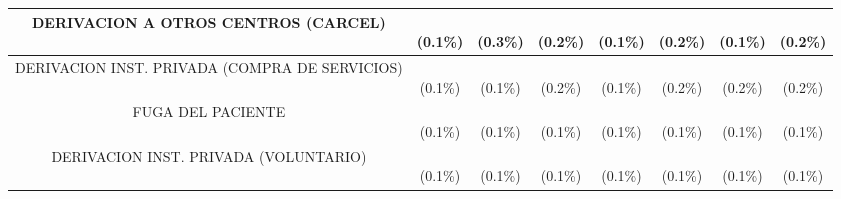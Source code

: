 \begin{table}[htbp]
\begin{tabular}{|c|c|c|c|c|c|c|c|}
\parbox[t]{4.0cm}{\raggedright DERIVACION A OTROS CENTROS (CARCEL)} & \parbox[t]{1.2cm}{\\(0.1\%)} & \parbox[t]{1.2cm}{\\(0.3\%)} & \parbox[t]{1.2cm}{\\(0.2\%)} & \parbox[t]{1.2cm}{\\(0.1\%)} & \parbox[t]{1.2cm}{\\(0.2\%)} & \parbox[t]{1.2cm}{\\(0.1\%)} & \parbox[t]{1.6cm}{\\(0.2\%)} \\ \hline
\parbox[t]{4.0cm}{\raggedright DERIVACION INST. PRIVADA (COMPRA DE SERVICIOS)} & \parbox[t]{1.2cm}{\\(0.1\%)} & \parbox[t]{1.2cm}{\\(0.1\%)} & \parbox[t]{1.2cm}{\\(0.2\%)} & \parbox[t]{1.2cm}{\\(0.1\%)} & \parbox[t]{1.2cm}{\\(0.2\%)} & \parbox[t]{1.2cm}{\\(0.2\%)} & \parbox[t]{1.6cm}{\\(0.2\%)} \\ \hline
\parbox[t]{4.0cm}{\raggedright FUGA DEL PACIENTE} & \parbox[t]{1.2cm}{\\(0.1\%)} & \parbox[t]{1.2cm}{\\(0.1\%)} & \parbox[t]{1.2cm}{\\(0.1\%)} & \parbox[t]{1.2cm}{\\(0.1\%)} & \parbox[t]{1.2cm}{\\(0.1\%)} & \parbox[t]{1.2cm}{\\(0.1\%)} & \parbox[t]{1.6cm}{\\(0.1\%)} \\ \hline
\parbox[t]{4.0cm}{\raggedright DERIVACION INST. PRIVADA (VOLUNTARIO)} & \parbox[t]{1.2cm}{\\(0.1\%)} & \parbox[t]{1.2cm}{\\(0.1\%)} & \parbox[t]{1.2cm}{\\(0.1\%)} & \parbox[t]{1.2cm}{\\(0.1\%)} & \parbox[t]{1.2cm}{\\(0.1\%)} & \parbox[t]{1.2cm}{\\(0.1\%)} & \parbox[t]{1.6cm}{\\(0.1\%)} \\ \hline

\end{tabular}
\end{table}
